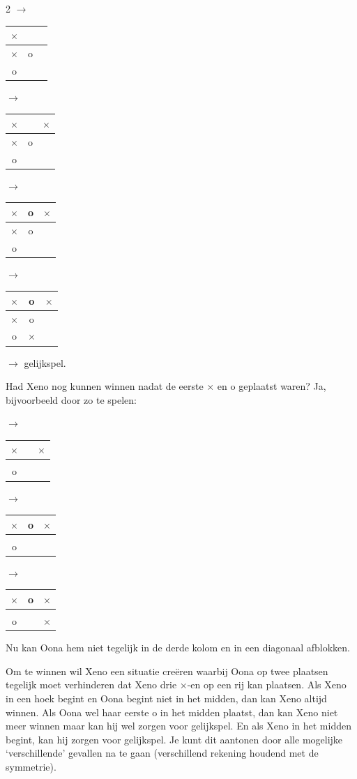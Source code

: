 \begin{multicols}{2}
$\rightarrow$ 
\begin{tabular}{c|c|c}
  $\times$ & \; & \; \\      \hline
   $\times$&  o&  \\      \hline
  o &  & 
\end{tabular}
$\rightarrow$ 
\begin{tabular}{c|c|c}
  $\times$ & \; & $\times$ \\      \hline
   $\times$&  o&  \\      \hline
  o &  & 
\end{tabular}
$\rightarrow$
\begin{tabular}{c|c|c}
  $\times$ & o & $\times$ \\      \hline
   $\times$&  o&  \\      \hline
 o &  & 
\end{tabular}

$\rightarrow$ \begin{tabular}{c|c|c}
  $\times$ & o & $\times$ \\      \hline
   $\times$&  o&  \\      \hline
  o &  $\times$& 
\end{tabular}$\rightarrow$ 
gelijkspel.

Had Xeno nog kunnen winnen nadat de eerste $\times$ en o geplaatst waren? Ja, bijvoorbeeld door zo te spelen:

$\rightarrow$
\begin{tabular}{c|c|c}
  $\times$ & \; & $\times$ \\      \hline
   &  &  \\      \hline
  o &  & 
\end{tabular}$\rightarrow$
\begin{tabular}{c|c|c}
  $\times$ & o & $\times$ \\      \hline
   &  &  \\      \hline
  o &  & 
\end{tabular}
$\rightarrow$ 
\begin{tabular}{c|c|c}
  $\times$ & o & $\times$ \\      \hline
   &  &  \\      \hline
  o &  & $\times$
\end{tabular}

Nu kan Oona hem niet tegelijk in de derde kolom en in een diagonaal afblokken.

Om te winnen wil Xeno een situatie creëren waarbij Oona op twee plaatsen tegelijk moet verhinderen dat Xeno drie $\times$-en op een rij kan plaatsen.
Als Xeno in een hoek begint en Oona begint niet in het midden, dan kan Xeno altijd winnen. Als Oona wel haar eerste o in het midden plaatst, dan kan Xeno niet meer winnen maar kan hij wel zorgen voor gelijkspel. En als Xeno in het midden begint, kan hij zorgen voor gelijkspel. Je kunt dit aantonen door alle mogelijke `verschillende' gevallen na te gaan (verschillend rekening houdend met de symmetrie).


\end{multicols}
